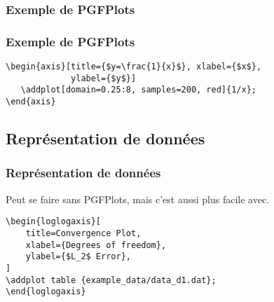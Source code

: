 \documentclass{clic_latex_beamer}
\begin{document}
\begin{frame}[fragile]
\frametitle{Exemple de PGFPlots}


\end{frame}

\begin{frame}[fragile]
\frametitle{Exemple de PGFPlots}

\begin{lstlisting}
\begin{axis}[title={$y=\frac{1}{x}$}, xlabel={$x$},
             ylabel={$y$}]
   \addplot[domain=0.25:8, samples=200, red]{1/x};
\end{axis}
\end{lstlisting}

\end{frame}


\subsection{Représentation de données}
\begin{frame}[fragile]
\frametitle{Représentation de données}
Peut se faire sans PGFPlots, mais c'est aussi plus facile avec.

\pause

\begin{multicols}{2}

\columnbreak

\begin{lstlisting}
\begin{loglogaxis}[
    title=Convergence Plot,
    xlabel={Degrees of freedom},
    ylabel={$L_2$ Error},
]
\addplot table {example_data/data_d1.dat};
\end{loglogaxis}
\end{lstlisting}

\end{multicols}

\end{frame}
\end{document}
